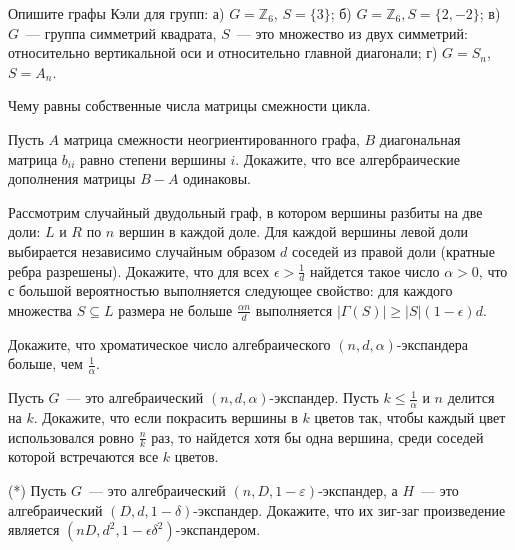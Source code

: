 \setcounter{curtask}{12}



\begin{task}
    Опишите графы Кэли для групп: а) $G = \mathbb{Z}_6$, $S = \{3\}$; 
	б) $G = \mathbb{Z}_6, S = \{2, -2\}$; в) $G$~--- группа  
	симметрий квадрата, $S$~--- это множество из двух симметрий: относительно вертикальной оси
	и относительно главной диагонали; г) $G = S_n$, $S = A_n$.
\end{task}

\begin{task}
    Чему равны собственные числа матрицы смежности цикла.
\end{task}

\begin{task}
    Пусть $A$ матрица смежности неогриентированного графа, $B$ диагональная матрица
    $b_{ii}$ равно степени вершины $i$. Докажите, что все алгербраические дополнения
    матрицы $B - A$ одинаковы.
\end{task}


\breakline

\begin{ptask}{5}
    Рассмотрим случайный двудольный граф, в котором вершины разбиты на две доли: $L$
	и $R$ по $n$ вершин в каждой доле. Для каждой вершины левой доли выбирается
	независимо случайным образом $d$ соседей из правой доли (кратные ребра
	разрешены). Докажите, что для всех $\epsilon > \frac{1}{d}$ найдется такое число
	$\alpha>0$, что с большой вероятностью выполняется следующее свойство: для
    каждого множества $S \subseteq L$ размера не больше $\frac{\alpha n}{d}$
    выполняется $|\Gamma(S)| \ge |S|(1 - \epsilon)d$.
\end{ptask}

\begin{ptask}{6}
    Докажите, что хроматическое число алгебраического $(n,d,\alpha)$-экспандера
    больше, чем $\frac{1}{\alpha}$.
\end{ptask}

\begin{ptask}{7}
    Пусть $G$~--- это алгебраический $(n,d,\alpha)$-экспандер. Пусть 
	$k\le \frac{1}{\alpha}$ и $n$ делится на $k$. Докажите, что если покрасить
    вершины  в $k$ цветов так, чтобы каждый цвет использовался ровно $\frac{n}{k}$
	раз, то найдется хотя бы одна вершина, среди соседей которой встречаются все $k$
    цветов.
\end{ptask}


\begin{ptask}{9}(*)
	Пусть $G$~--- это алгебраический $(n,D, 1-\varepsilon)$-экспандер, а $H$~--- это
    алгебраический $(D, d, 1-\delta)$-экспандер. Докажите, что их зиг-заг
    произведение является $(nD, d^2, 1 - \epsilon \delta^2)$-экспандером.
\end{ptask}

